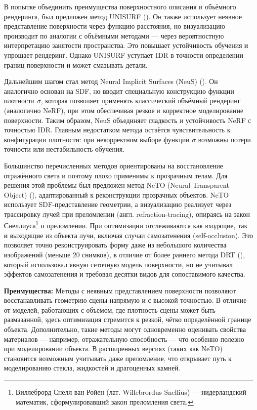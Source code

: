 В попытке объединить преимущества поверхностного описания и объёмного
рендеринга, был предложен метод UNISURF
(\cite{oechsle2021unisurfunifyingneuralimplicit}). Он также использует неявное
представление поверхности через функцию расстояния, но визуализацию производит
по аналогии с объёмными методами — через вероятностную интерпретацию занятости
пространства. Это повышает устойчивость обучения и упрощает рендеринг. Однако
UNISURF уступает IDR в точности определении границ поверхности и может смазывать
детали.

Дальнейшим шагом стал метод Neural Implicit Surfaces (NeuS)
(\cite{wang2023neuslearningneuralimplicit}). Он аналогично основан на SDF, но вводит
специальную конструкцию функции плотности $\sigma$, которая позволяет применять
классический объёмный рендеринг (аналогично NeRF), при этом обеспечивая резкое и
корректное моделирование поверхности. Таким образом, NeuS объединяет гладкость и
устойчивость NeRF с точностью IDR. Главным недостатком метода остаётся
чувствительность к конфигурации плотности: при некорректном выборе функции
$\sigma$ возможны потери точности или нестабильность обучения.

Большинство перечисленных методов ориентированы на восстановление отражённого
света и поэтому плохо применимы к прозрачным телам. Для решения этой проблемы
был предложен метод NeTO (Neural Transparent Object)
(\cite{li2023netoneuralreconstructiontransparentobjects}), адаптированный к
реконструкции прозрачных объектов. NeTO использует SDF-представление геометрии,
а визуализацию реализует через трассировку
лучей при преломлении (англ. refraction-tracing), опираясь на закон Снеллиуса\footnote{Виллеброрд Снелл ван Ройен (лат.
Willebrordus Snellius) — нидерландский математик, сформулировавший закон
преломления света.} о преломлении. При оптимизации отслеживаются как входящие, так и
выходящие из объекта лучи, включая случаи самозатенения (self-occlusion). Это
позволяет точно реконструировать форму даже из небольшого количества изображений
(меньше 20 снимков), в отличие от более раннего метода DRT
(\cite{Lyu_2020}), который использовал явную сеточную модель поверхности, но не
учитывал эффектов самозатенения и требовал десятки видов для сопоставимого
качества.

\textbf{Преимущества:} Методы с неявным представлением поверхности позволяют
восстанавливать геометрию сцены напрямую и с высокой точностью. В отличие от
моделей, работающих с объемом, где плотность сцены может быть размазанной, здесь
оптимизация стремится к резкой, чётко определённой границе объекта.
Дополнительно, такие методы могут одновременно оценивать свойства материалов —
например, отражательную способность — что особенно полезно при моделировании
объекта. В расширенных версиях (таких как NeTO) становится возможным учитывать
даже преломление, что открывает путь к моделированию стекла, жидкостей и
драгоценных камней.


